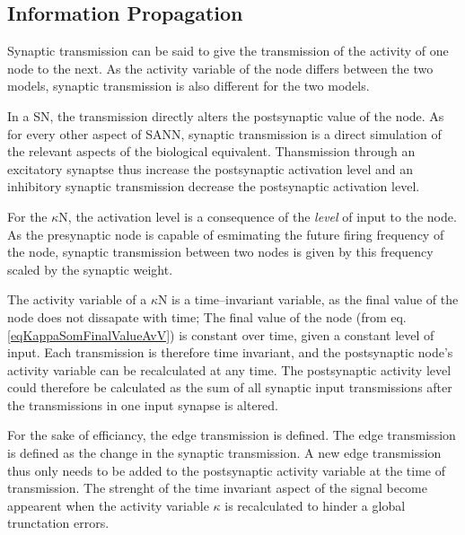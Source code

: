 	\subsection{Information Propagation}
	Synaptic transmission can be said to give the transmission of the activity of one node to the next.
	As the activity variable of the node differs between the two models, synaptic transmission is also different for the two models.

	In a SN, the transmission directly alters the postsynaptic value of the node.
	As for every other aspect of SANN, synaptic transmission is a direct simulation of the relevant aspects of the biological equivalent.
	Thansmission through an excitatory synaptse thus increase the postsynaptic activation level and an inhibitory synaptic transmission decrease the postsynaptic activation level.

	For the $\kappa$N, the activation level is a consequence of the \emph{level} of input to the node.
	As the presynaptic node is capable of esmimating the future firing frequency of the node, synaptic transmission between two nodes is given by this frequency scaled by the synaptic weight.

	The activity variable of a $\kappa$N is a time--invariant variable, as the final value of the node does not dissapate with time;
		The final value of the node (from eq. \ref{eqKappaSomFinalValueAvV}) is constant over time, given a constant level of input.
	Each transmission is therefore time invariant, and the postsynaptic node's activity variable can be recalculated at any time.
	The postsynaptic activity level could therefore be calculated as the sum of all synaptic input transmissions after the transmissions in one input synapse is altered.

	For the sake of efficiancy, the edge transmission is defined.
	The edge transmission is defined as the change in the synaptic transmission.
	A new edge transmission thus only needs to be added to the postsynaptic activity variable at the time of transmission.
	The strenght of the time invariant aspect of the signal become appearent when the activity variable $\kappa$ is recalculated to hinder a global trunctation errors.



